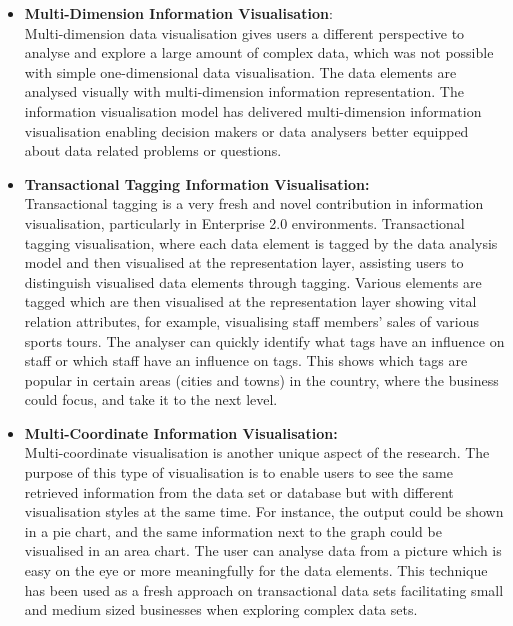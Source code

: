 \begin{itemize}
\item \textbf{Multi-Dimension Information  Visualisation}:\\

Multi-dimension data visualisation gives users a different perspective to analyse and explore a large amount of complex data, which was not possible with simple one-dimensional data visualisation. The data elements are analysed visually with multi-dimension information representation. The information visualisation model has delivered multi-dimension information visualisation enabling decision makers or data analysers better equipped about data related problems or questions. \\

\item \textbf{Transactional Tagging Information Visualisation:}\\ 

Transactional tagging is a very fresh and novel contribution in information visualisation, particularly in Enterprise 2.0 environments. Transactional tagging visualisation, where each data element is tagged by the data analysis model and then visualised at the representation layer, assisting users to distinguish visualised data elements through tagging. Various elements are tagged which are then visualised at the representation layer showing vital relation attributes, for example, visualising staff members' sales of various sports tours. The analyser can quickly identify what tags have an influence on staff or which staff have an influence on tags. This shows which tags are popular in certain areas (cities and towns) in the country, where the business could focus, and take it to the next level.

\item \textbf{Multi-Coordinate Information Visualisation:} \\

Multi-coordinate visualisation is another unique aspect of the research. The purpose of this type of visualisation is to enable users to see the same retrieved information from the data set or database but with different visualisation styles at the same time. For instance, the output could be shown in a pie chart, and the same information next to the graph could be visualised in an area chart. The user can analyse data from a picture which is easy on the eye or more meaningfully for the data elements. This technique has been used as a fresh approach on transactional data sets facilitating small and medium sized businesses when exploring complex data sets.\\



\end{itemize}
